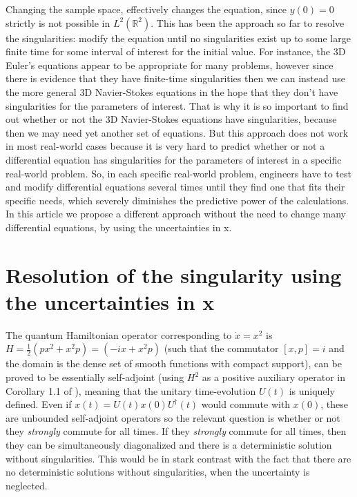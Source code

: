 \documentclass[11pt]{book}
\begin{document}
Changing the sample space, effectively changes the equation, since
\(y(0)=0\) strictly is not possible in \(L^2(\mathbb{R}^2)\). This has
been the approach so far to resolve the singularities: modify the
equation until no singularities exist up to some large finite time for
some interval of interest for the initial value. For instance, the 3D
Euler's equations appear to be appropriate for many problems, however
since there is evidence that they have finite-time
singularities\cite{3Deuler} then
we can instead use the more general 3D Navier-Stokes
equations\cite{deng_hilberts_2025}
in the hope that they don't have singularities for the parameters of
interest. That is why it is so important to find out whether or not the
3D Navier-Stokes equations have
singularities\cite{3Deuler},
because then we may need yet another set of equations. But this approach
does not work in most real-world cases because it is very hard to
predict whether or not a differential equation has singularities for the
parameters of interest in a specific real-world
problem\cite{3Deuler}. So, in each
specific real-world problem, engineers have to test and modify
differential equations several times until they find one that fits their
specific needs, which severely diminishes the predictive power of the
calculations. In this article we propose a different approach without
the need to change many differential equations, by using the
uncertainties in x.

\hypertarget{resolution-of-the-singularity-using-the-uncertainties-in-x}{%
\section{Resolution of the singularity using the uncertainties in
x}\label{resolution-of-the-singularity-using-the-uncertainties-in-x}}

The quantum Hamiltonian operator corresponding to \(\dot{x}=x^2\) is
\(H=\frac{1}{2}(p x^2+x^2 p)=(-i x+x^2 p)\) (such that the commutator
\([x,p]=i\) and the domain is the dense set of smooth functions with
compact support), can be proved to be essentially
self-adjoint\cite{cmpux2f1103859517}\cite{faris2006self} (using \(H^2\) as a positive auxiliary operator in
Corollary 1.1 of \cite{cmpux2f1103859517}), meaning that the unitary time-evolution
\(U(t)\) is uniquely defined. Even if \(x(t)=U(t)x(0)U^\dagger(t)\)
would commute with \(x(0)\), these are unbounded self-adjoint operators
so the relevant question is whether or not they \emph{strongly }commute
for all times. If they \emph{strongly }commute for all times, then they
can be simultaneously diagonalized and there is a deterministic solution
without singularities. This would be in stark contrast with the fact
that there are no deterministic solutions without singularities, when
the uncertainty is
neglected\cite{GORIELY2000422}.
\end{document}
